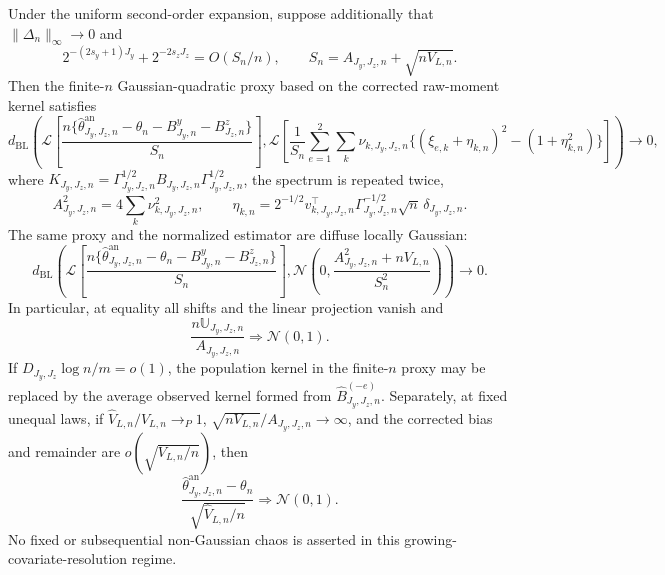 Under the uniform second-order expansion, suppose additionally that \(\|\Delta_n\|_\infty\to0\) and
\[
2^{-(2s_y+1)J_y}+2^{-2s_zJ_z}=O(S_n/n),
\qquad
S_n=A_{J_y,J_z,n}+\sqrt{nV_{L,n}}.
\]
Then the finite-\(n\) Gaussian-quadratic proxy based on the corrected raw-moment kernel satisfies
\[
d_{\mathrm{BL}}\!\left(
\mathcal L\left[\frac{n\{\widehat\theta^{\mathrm{an}}_{J_y,J_z,n}-\theta_n-B^y_{J_y,n}-B^z_{J_z,n}\}}{S_n}\right],
\mathcal L\left[\frac1{S_n}\sum_{e=1}^2\sum_k\nu_{k,J_y,J_z,n}
\{(\xi_{e,k}+\eta_{k,n})^2-(1+\eta_{k,n}^2)\}\right]
\right)\to0,
\]
where \(K_{J_y,J_z,n}=\Gamma_{J_y,J_z,n}^{1/2}B_{J_y,J_z,n}\Gamma_{J_y,J_z,n}^{1/2}\), the spectrum is repeated twice,
\[
A_{J_y,J_z,n}^2=4\sum_k\nu_{k,J_y,J_z,n}^2,
\qquad
\eta_{k,n}=2^{-1/2}v_{k,J_y,J_z,n}^{\top}\Gamma_{J_y,J_z,n}^{-1/2}\sqrt n\,\delta_{J_y,J_z,n}.
\]
The same proxy and the normalized estimator are diffuse locally Gaussian:
\[
d_{\mathrm{BL}}\!\left(
\mathcal L\left[\frac{n\{\widehat\theta^{\mathrm{an}}_{J_y,J_z,n}-\theta_n-B^y_{J_y,n}-B^z_{J_z,n}\}}{S_n}\right],
\mathcal N\!\left(0,\frac{A_{J_y,J_z,n}^2+nV_{L,n}}{S_n^2}\right)
\right)\to0.
\]
In particular, at equality all shifts and the linear projection vanish and
\[
\frac{n\mathbb U_{J_y,J_z,n}}{A_{J_y,J_z,n}}\Rightarrow\mathcal N(0,1).
\]
If \(D_{J_y,J_z}\log n/m=o(1)\), the population kernel in the finite-\(n\) proxy may be replaced by the average observed kernel formed from \(\widehat B_{J_y,J_z,n}^{(-e)}\). Separately, at fixed unequal laws, if \(\widehat V_{L,n}/V_{L,n}\to_P1\), \(\sqrt{nV_{L,n}}/A_{J_y,J_z,n}\to\infty\), and the corrected bias and remainder are \(o(\sqrt{V_{L,n}/n})\), then
\[
\frac{\widehat\theta^{\mathrm{an}}_{J_y,J_z,n}-\theta_n}{\sqrt{\widehat V_{L,n}/n}}\Rightarrow\mathcal N(0,1).
\]
No fixed or subsequential non-Gaussian chaos is asserted in this growing-covariate-resolution regime.